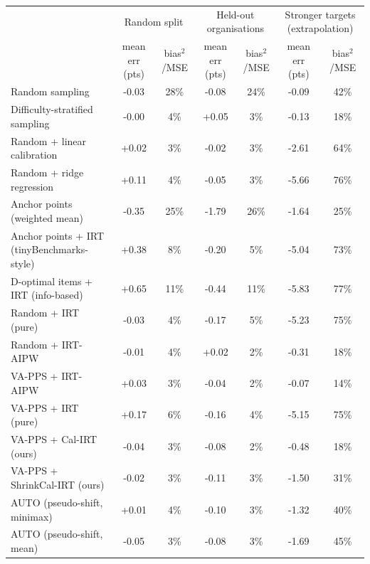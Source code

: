 \begin{tabular}{lcccccc}
\toprule
 & \multicolumn{2}{c}{Random split} & \multicolumn{2}{c}{Held-out organisations} & \multicolumn{2}{c}{Stronger targets (extrapolation)} \\
 & mean err (pts) & bias$^2$/MSE & mean err (pts) & bias$^2$/MSE & mean err (pts) & bias$^2$/MSE \\
\midrule
Random sampling & -0.03 & 28\% & -0.08 & 24\% & -0.09 & 42\% \\
Difficulty-stratified sampling & -0.00 & 4\% & +0.05 & 3\% & -0.13 & 18\% \\
Random + linear calibration & +0.02 & 3\% & -0.02 & 3\% & -2.61 & 64\% \\
Random + ridge regression & +0.11 & 4\% & -0.05 & 3\% & -5.66 & 76\% \\
Anchor points (weighted mean) & -0.35 & 25\% & -1.79 & 26\% & -1.64 & 25\% \\
Anchor points + IRT (tinyBenchmarks-style) & +0.38 & 8\% & -0.20 & 5\% & -5.04 & 73\% \\
D-optimal items + IRT (info-based) & +0.65 & 11\% & -0.44 & 11\% & -5.83 & 77\% \\
Random + IRT (pure) & -0.03 & 4\% & -0.17 & 5\% & -5.23 & 75\% \\
Random + IRT-AIPW & -0.01 & 4\% & +0.02 & 2\% & -0.31 & 18\% \\
VA-PPS + IRT-AIPW & +0.03 & 3\% & -0.04 & 2\% & -0.07 & 14\% \\
VA-PPS + IRT (pure) & +0.17 & 6\% & -0.16 & 4\% & -5.15 & 75\% \\
VA-PPS + Cal-IRT (ours) & -0.04 & 3\% & -0.08 & 2\% & -0.48 & 18\% \\
VA-PPS + ShrinkCal-IRT (ours) & -0.02 & 3\% & -0.11 & 3\% & -1.50 & 31\% \\
AUTO (pseudo-shift, minimax) & +0.01 & 4\% & -0.10 & 3\% & -1.32 & 40\% \\
AUTO (pseudo-shift, mean) & -0.05 & 3\% & -0.08 & 3\% & -1.69 & 45\% \\
\bottomrule
\end{tabular}
